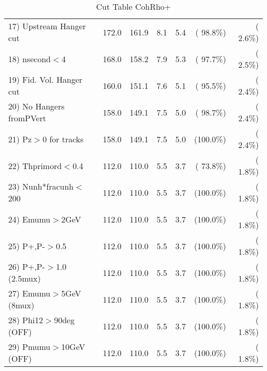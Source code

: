 \begin{table}[h!]
\begin{tabular}{||l||r|r|r|r|r|r||}
 17) Upstream Hanger cut  &        172.0 &        161.9 &          8.1 &          5.4 & ( 98.8\%) & (  2.6\%) \\
 18) nsecond$<$4          &        168.0 &        158.2 &          7.9 &          5.3 & ( 97.7\%) & (  2.5\%) \\
 19) Fid. Vol. Hanger cut &        160.0 &        151.1 &          7.6 &          5.1 & ( 95.5\%) & (  2.4\%) \\
 20) No Hangers fromPVert &        158.0 &        149.1 &          7.5 &          5.0 & ( 98.7\%) & (  2.4\%) \\
 21) Pz$>$0 for tracks    &        158.0 &        149.1 &          7.5 &          5.0 & (100.0\%) & (  2.4\%) \\
 22) Thprimord$<$0.4      &        112.0 &        110.0 &          5.5 &          3.7 & ( 73.8\%) & (  1.8\%) \\
 23) Nunh*fracunh$<$200   &        112.0 &        110.0 &          5.5 &          3.7 & (100.0\%) & (  1.8\%) \\
 24) Emumu$>$2GeV         &        112.0 &        110.0 &          5.5 &          3.7 & (100.0\%) & (  1.8\%) \\
 25) P+,P-$>$0.5          &        112.0 &        110.0 &          5.5 &          3.7 & (100.0\%) & (  1.8\%) \\
 26) P+,P-$>$1.0 (2.5mux) &        112.0 &        110.0 &          5.5 &          3.7 & (100.0\%) & (  1.8\%) \\
 27) Emumu$>$5GeV  (8mux) &        112.0 &        110.0 &          5.5 &          3.7 & (100.0\%) & (  1.8\%) \\
 28) Phi12$>$90deg  (OFF) &        112.0 &        110.0 &          5.5 &          3.7 & (100.0\%) & (  1.8\%) \\
 29) Pmumu$>$10GeV  (OFF) &        112.0 &        110.0 &          5.5 &          3.7 & (100.0\%) & (  1.8\%) \\
 \hline
 \hline
 \end{tabular}
 \caption{Cut Table  CohRho+  }
 \label{tab-cutcohjpsi-mumu_cohrhop}
 \end{table}
